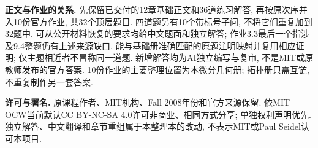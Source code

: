 \noindent\textbf{正文与作业的关系.} 先保留已交付的12章基础正文和36道练习解答, 再按原次序并入10份官方作业, 共32个顶层题目. 四道题另有10个带标号子问, 不将它们重复加到32题中. 可从公开材料恢复的要求均给中文题面和独立解答; 作业3.3最后一个指涉及9.4整题仍有上述来源缺口. 能与基础册准确匹配的原题注明映射并复用相应证明; 仅主题相近者不冒称同一道题. 新增解答均为AI独立编写与复审, 不是MIT或原教师发布的官方答案. 10份作业的主要整理位置为本微分几何册; 拓扑册只需互链, 不重复制作另一套答案.

\noindent\textbf{许可与署名.} 原课程作者、MIT机构、Fall 2008年份和官方来源保留. 依MIT OCW当前默认CC BY-NC-SA 4.0许可非商业、相同方式分享; 单独权利声明优先. 独立解答、中文翻译和章节重组属于本整理本的改动, 不表示MIT或Paul Seidel认可本项目.
\clearpage
